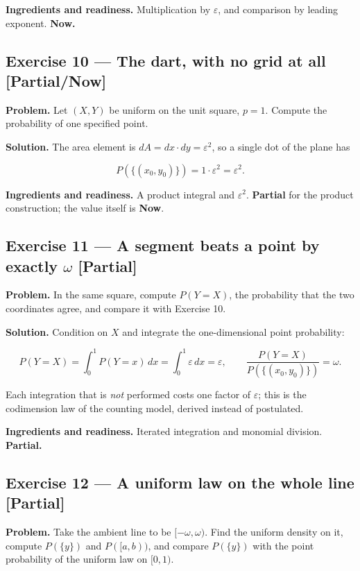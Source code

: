 \documentclass[11pt]{article}
\newcommand{\eps}{\varepsilon}
\renewcommand{\epsilon}{\varepsilon}
\begin{document}
\textbf{Ingredients and readiness.} Multiplication by $\eps$, and comparison by
leading exponent. \textbf{Now.}


\subsection*{Exercise 10 --- The dart, with no grid at all \hfill \normalfont\small[Partial/Now]}

\textbf{Problem.} Let $(X,Y)$ be uniform on the unit square, $p = 1$. Compute the
probability of one specified point.

\textbf{Solution.} The area element is $dA = dx\cdot dy = \eps^2$, so a single dot of
the plane has

\[
P(\{(x_0,y_0)\})=1\cdot\epsilon^{2}=\epsilon^{2}.
\]

\textbf{Ingredients and readiness.} A product integral and $\eps^2$. \textbf{Partial}
for the product construction; the value itself is \textbf{Now}.


\subsection*{Exercise 11 --- A segment beats a point by exactly $\omega$ \hfill \normalfont\small[Partial]}

\textbf{Problem.} In the same square, compute $P(Y = X)$, the probability that the
two coordinates agree, and compare it with Exercise 10.

\textbf{Solution.} Condition on $X$ and integrate the one-dimensional point
probability:

\[
P(Y=X)=\int_0^1 P(Y=x)\,dx=\int_0^1 \epsilon\,dx=\epsilon,
\qquad
\frac{P(Y=X)}{P(\{(x_0,y_0)\})}=\omega .
\]

Each integration that is \emph{not} performed costs one factor of $\eps$; this
is the codimension law of the counting model, derived instead of postulated.

\textbf{Ingredients and readiness.} Iterated integration and monomial division.
\textbf{Partial.}


\subsection*{Exercise 12 --- A uniform law on the whole line \hfill \normalfont\small[Partial]}

\textbf{Problem.} Take the ambient line to be $[-\omega, \omega)$. Find the uniform
density on it, compute $P(\{y\})$ and $P([a,b))$, and compare $P(\{y\})$ with the
point probability of the uniform law on $[0,1)$.
\end{document}
